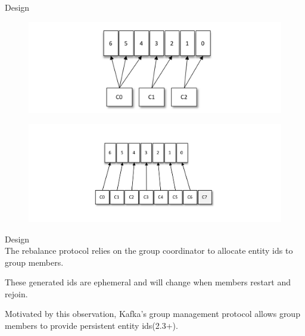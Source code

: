 \begin{frame}[plain,t]{Design} %
     \\
       \begin{figure}
        \centering
        \includegraphics[width=0.9\linewidth]{image/0208}
        \label{fig:0208}
    \end{figure}
\vspace{-4ex}
    \begin{figure}
        \centering
        \includegraphics[width=0.9\linewidth]{image/0209}
        \label{fig:0209}
    \end{figure}
    
    
\end{frame}
\begin{frame}[plain,t]{Design} %
     \\
    \vspace{2ex}
    The rebalance protocol relies on the group coordinator to allocate entity ids to group members. 
    
     \vspace{2ex}
    These generated ids are ephemeral and will change when members restart and rejoin. 
    
     \vspace{2ex}
    Motivated by this observation, Kafka’s group management protocol allows group members to provide persistent entity ids(2.3+).
    
    
\end{frame}
